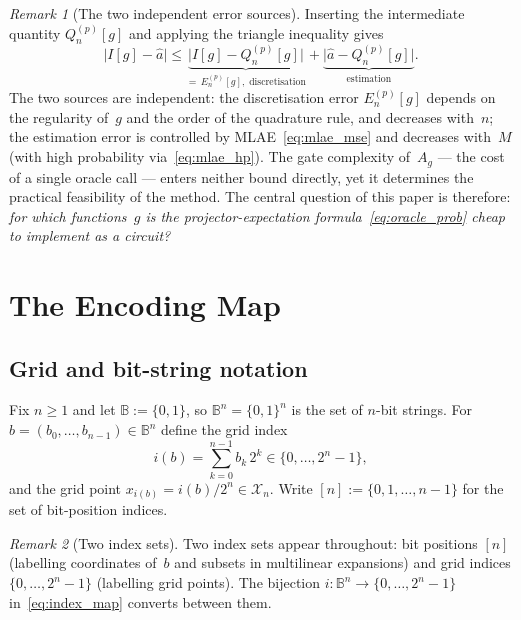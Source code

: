 \documentclass[12pt,a4paper]{article}
\theoremstyle{plain}
\theoremstyle{definition}
\theoremstyle{remark}
\newtheorem{remark}[remark]{Remark}
\begin{document}
\begin{remark}[The two independent error sources]
\label{rem:two_errors}
Inserting the intermediate quantity $Q_n^{(p)}[g]$
and applying the triangle inequality gives
\begin{equation*}
  \bigl|I[g] - \hat{a}\bigr|
  \leq \underbrace{\bigl|I[g] - Q_n^{(p)}[g]\bigr|}_{
         =\,E_n^{(p)}[g],\;\text{discretisation}}
     + \underbrace{\bigl|\hat{a} - Q_n^{(p)}[g]\bigr|}_{
         \text{estimation}}.
\end{equation*}
The two sources are independent: the discretisation error
$E_n^{(p)}[g]$ depends on the regularity of~$g$ and the order
of the quadrature rule, and decreases with~$n$; the estimation
error is controlled by MLAE~\eqref{eq:mlae_mse} and decreases
with~$M$ (with high probability via~\eqref{eq:mlae_hp}).
The gate complexity of~$A_g$ — the cost of a single oracle
call — enters neither bound directly, yet it determines the
practical feasibility of the method.
The central question of this paper is therefore: \emph{for
which functions~$g$ is the projector-expectation
formula~\eqref{eq:oracle_prob} cheap to implement as a
circuit?}
\end{remark}

\section{The Encoding Map}
\label{sec:encoding}

\subsection{Grid and bit-string notation}

Fix $n \geq 1$ and let $\mathbb{B} := \{0,1\}$, so
$\mathbb{B}^n = \{0,1\}^n$ is the set of $n$-bit strings.
For $b = (b_0,\ldots,b_{n-1}) \in \mathbb{B}^n$ define the grid index
\begin{equation}
  i(b) = \sum_{k=0}^{n-1} b_k\, 2^k \in \{0,\ldots,2^n-1\},
  \label{eq:index_map}
\end{equation}
and the grid point $x_{i(b)} = i(b)/2^n \in \mathcal{X}_n$.
Write $[n] := \{0,1,\ldots,n-1\}$ for the set of bit-position indices.

\begin{remark}[Two index sets]
Two index sets appear throughout: bit positions $[n]$ (labelling
coordinates of~$b$ and subsets in multilinear expansions) and grid
indices $\{0,\ldots,2^n-1\}$ (labelling grid points).
The bijection $i:\mathbb{B}^n\to\{0,\ldots,2^n-1\}$ in~\eqref{eq:index_map}
converts between them.
\end{remark}
\end{document}

